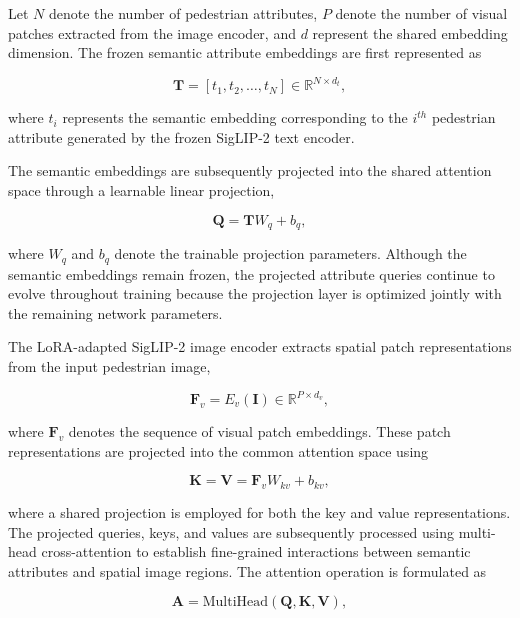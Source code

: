 \documentclass{ieeeaccess}
\begin{document}
Let $N$ denote the number of pedestrian attributes, $P$ denote the number of visual patches extracted from the image encoder, and $d$ represent the shared embedding dimension. The frozen semantic attribute embeddings are first represented as

\begin{equation}
\mathbf{T}
=
\left[
t_1,t_2,\ldots,t_N
\right]
\in
\mathbb{R}^{N\times d_t},
\label{eq:text_embedding}
\end{equation}

where $t_i$ represents the semantic embedding corresponding to the $i^{th}$ pedestrian attribute generated by the frozen SigLIP-2 text encoder.

The semantic embeddings are subsequently projected into the shared attention space through a learnable linear projection,

\begin{equation}
\mathbf{Q}
=
\mathbf{T}W_q+b_q,
\label{eq:query_projection}
\end{equation}

where $W_q$ and $b_q$ denote the trainable projection parameters. Although the semantic embeddings remain frozen, the projected attribute queries continue to evolve throughout training because the projection layer is optimized jointly with the remaining network parameters.

The LoRA-adapted SigLIP-2 image encoder extracts spatial patch representations from the input pedestrian image,

\begin{equation}
\mathbf{F}_v
=
E_v(\mathbf{I})
\in
\mathbb{R}^{P\times d_v},
\label{eq:visual_patch}
\end{equation}

where $\mathbf{F}_v$ denotes the sequence of visual patch embeddings. These patch representations are projected into the common attention space using

\begin{equation}
\mathbf{K}
=
\mathbf{V}
=
\mathbf{F}_vW_{kv}+b_{kv},
\label{eq:kv_projection}
\end{equation}

where a shared projection is employed for both the key and value representations. The projected queries, keys, and values are subsequently processed using multi-head cross-attention to establish fine-grained interactions between semantic attributes and spatial image regions. The attention operation is formulated as

\begin{equation}
\mathbf{A}
=
\mathrm{MultiHead}
(\mathbf{Q},\mathbf{K},\mathbf{V}),
\label{eq:cross_attention}
\end{equation}
\end{document}
